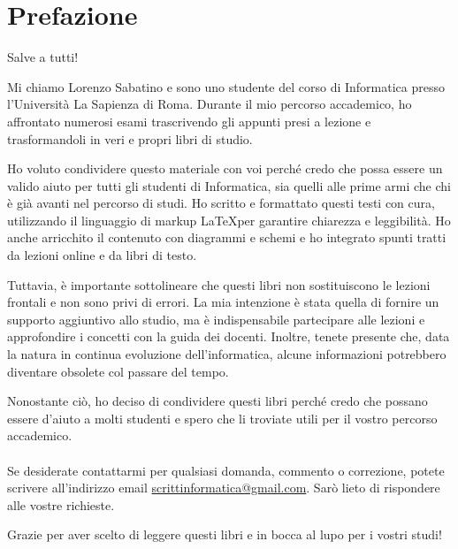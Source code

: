 \chapter*{Prefazione}

Salve a tutti!

Mi chiamo Lorenzo Sabatino e sono uno studente del corso di Informatica presso l'Università La Sapienza di Roma. Durante il mio percorso accademico, ho affrontato numerosi esami trascrivendo gli appunti presi a lezione e trasformandoli in veri e propri libri di studio.

Ho voluto condividere questo materiale con voi perché credo che possa essere un valido aiuto per tutti gli studenti di Informatica, sia quelli alle prime armi che chi è già avanti nel percorso di studi. Ho scritto e formattato questi testi con cura, utilizzando il linguaggio di markup \LaTeX per garantire chiarezza e leggibilità. Ho anche arricchito il contenuto con diagrammi e schemi e ho integrato spunti tratti da lezioni online e da libri di testo.

Tuttavia, è importante sottolineare che questi libri non sostituiscono le lezioni frontali e non sono privi di errori. La mia intenzione è stata quella di fornire un supporto aggiuntivo allo studio, ma è indispensabile partecipare alle lezioni e approfondire i concetti con la guida dei docenti. Inoltre, tenete presente che, data la natura in continua evoluzione dell'informatica, alcune informazioni potrebbero diventare obsolete col passare del tempo.

Nonostante ciò, ho deciso di condividere questi libri perché credo che possano essere d'aiuto a molti studenti e spero che li troviate utili per il vostro percorso accademico.\\\\
Se desiderate contattarmi per qualsiasi domanda, commento o correzione, potete scrivere all'indirizzo email \href{mailto:scrittinformatica@gmail.com}{scrittinformatica@gmail.com}. Sarò lieto di rispondere alle vostre richieste.

Grazie per aver scelto di leggere questi libri e in bocca al lupo per i vostri studi!